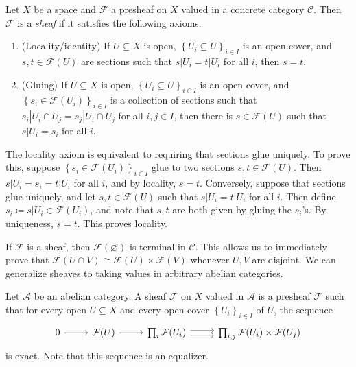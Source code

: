 \begin{definition}\label{dfn:2-2-3}
	Let $X$ be a space and $\mathcal{F} $ a presheaf on $X$ valued in a concrete category $\mathcal{C} $. Then $\mathcal{F} $ is a \emph{sheaf} if it satisfies the following axioms:
	\begin{enumerate}
		\item (Locality/identity) If $U\subseteq X$ is open, $\left\{ U_i\subseteq U \right\} _{i\in I} $ is an open cover, and $s,t\in \mathcal{F} (U)$ are sections such that $s|U_i=t|U_i$ for all $i$, then $s=t$.
		\item (Gluing) If $U\subseteq X$ is open, $\left\{ U_i\subseteq U \right\} _{i\in I} $ is an open cover, and $\left\{ s_i\in \mathcal{F} (U_i) \right\} _{i\in I} $ is a collection of sections such that $s_i|U_i \cap U_j = s_j|U_i\cap U_j$ for all $i,j\in I$, then there is $s\in \mathcal{F} (U)$ such that $s|U_i=s_i$ for all $i$.
	\end{enumerate}
\end{definition}
\begin{remark}\label{rmk:2-2-4}
	The locality axiom is equivalent to requiring that sections glue uniquely. To prove this, suppose $\left\{ s_i\in \mathcal{F} (U_i) \right\} _{i\in I} $ glue to two sections $s,t\in \mathcal{F} (U)$. Then $s|U_i = s_i = t|U_i$ for all $i$, and by locality, $s=t$. Conversely, suppose that sections glue uniquely, and let $s,t\in \mathcal{F} (U)$ such that $s|U_i = t|U_i$ for all $i$. Then define $s_i \coloneqq s|U_i\in \mathcal{F} (U_i)$, and note that $s,t$ are both given by gluing the $s_i$'s. By uniqueness, $s=t$. This proves locality.
\end{remark}

If $\mathcal{F} $ is a sheaf, then $\mathcal{F} (\varnothing )$ is terminal in $\mathcal{C} $. This allows us to immediately prove that $\mathcal{F} (U \cap V) \cong \mathcal{F} (U)\times \mathcal{F} (V)$ whenever $U,V$ are disjoint. We can generalize sheaves to taking values in arbitrary abelian categories.

\begin{definition}\label{dfn:2-2-5}
	Let $\mathcal{A} $ be an abelian category. A sheaf $\mathcal{F} $ on $X$ valued in $\mathcal{A} $ is a presheaf $\mathcal{F} $ such that for every open $U\subseteq X$ and every open cover $\left\{ U_i \right\} _{i\in I} $ of $U$, the sequence
	\[\begin{tikzcd}[row sep = 2.5em, column sep = 2.5em]
	0\ar[r]  & \mathcal{F} (U)\ar[r]  & \prod_{i} \mathcal{F} (U_i)\ar[shift left, r] \ar[shift right, r]  & \prod_{i,j} \mathcal{F} (U_i)\times \mathcal{F} (U_j)
	\end{tikzcd}\]
	is exact. Note that this sequence is an equalizer.
\end{definition}


